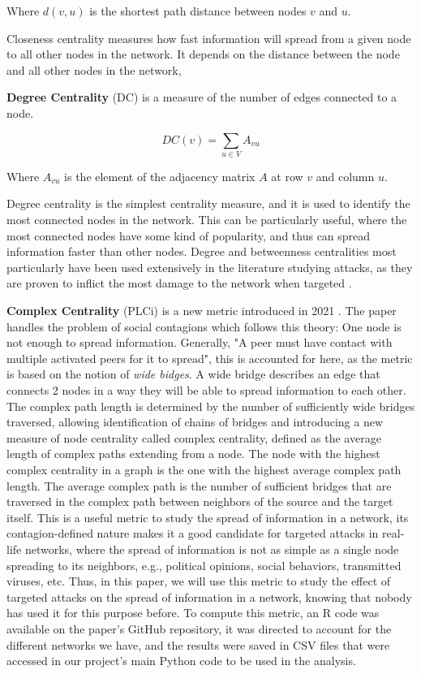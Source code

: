 Where $d(v,u)$ is the shortest path distance between nodes $v$ and $u$.

Closeness centrality measures how fast information will spread from a given node to all other nodes in the network.
It depends on the distance between the node and all other nodes in the network,

\newline
\textbf{Degree Centrality} (DC) is a measure of the number of edges connected to a node.

\begin{equation}
    DC(v) = \sum_{u \in V} A_{vu}
\end{equation}

Where $A_{vu}$ is the element of the adjacency matrix $A$ at row $v$ and column $u$.

Degree centrality is the simplest centrality measure, and it is used to identify the most connected nodes in the network.
This can be particularly useful, where the most connected nodes have some kind of popularity,
and thus can spread information faster than other nodes. 
Degree and betweenness centralities most particularly have been used extensively in the literature studying attacks,
as they are proven to inflict the most damage to the network when targeted \cite{tomassini2023rewiring}.

\newline
\textbf{Complex Centrality} (PLCi) is a new metric introduced in 2021 \cite{contagion_paper}.
The paper handles the problem of social contagions which follows this theory: 
One node is not enough to spread information. 
Generally, "A peer must have contact with multiple activated peers for it to spread",
this is accounted for here, as the metric is based on the notion of \textit{wide bidges}.
A wide bridge describes an edge that connects 2 nodes in a way they will be able to spread information to each other.
The complex path length is determined by the number of sufficiently wide bridges traversed, 
allowing identification of chains of bridges and introducing a new measure of node centrality called complex centrality, 
defined as the average length of complex paths extending from a node. 
The node with the highest complex centrality in a graph is the one with the highest average complex path length.
The average complex path is the number of sufficient bridges
that are traversed in the complex path between neighbors of the source and the target itself.
This is a useful metric to study the spread of information in a network, 
its contagion-defined nature makes it a good candidate for targeted attacks in real-life networks,
where the spread of information is not as simple as a single node spreading to its neighbors, e.g., political opinions, social behaviors, transmitted viruses, etc.
Thus, in this paper, we will use this metric to study the effect of targeted attacks on the spread of information in a network,
knowing that nobody has used it for this purpose before.
To compute this metric, an R code was available on the paper's GitHub repository,
it was directed to account for the different networks we have, and the results were saved in CSV files that were accessed
in our project's main Python code to be used in the analysis.

